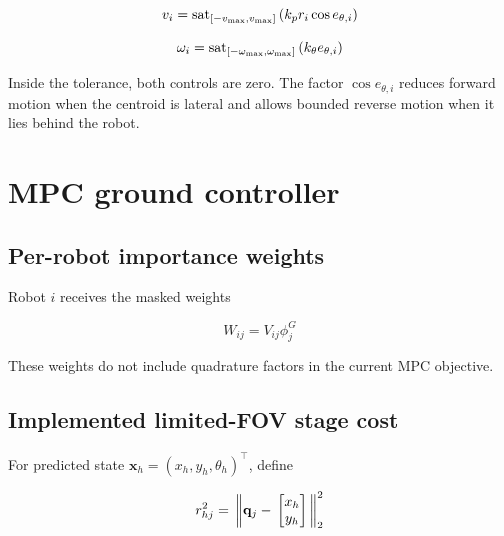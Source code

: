 \documentclass[11pt]{article}
\begin{document}
\begin{equation}
v_i \\
= \\
\mathrm{sat}_{[-v_{\max},v_{\max}]} \\
\left(k_p r_i\cos e_{\theta,i}\right)
\end{equation}


\begin{equation}
\omega_i \\
= \\
\mathrm{sat}_{[-\omega_{\max},\omega_{\max}]} \\
\left(k_\theta e_{\theta,i}\right)
\end{equation}


Inside the tolerance, both controls are zero. The factor $\cos e_{\theta,i}$ reduces forward motion when the centroid is lateral and allows bounded reverse motion when it lies behind the robot.


\section{MPC ground controller}


\subsection{Per-robot importance weights}


Robot $i$ receives the masked weights


\begin{equation}
W_{ij}=V_{ij}\phi^G_j
\end{equation}


These weights do not include quadrature factors in the current MPC objective.


\subsection{Implemented limited-FOV stage cost}


For predicted state $\mathbf x_h=(x_h,y_h,\theta_h)^\top$, define


\begin{equation}
r_{hj}^2 \\
= \\
\left\lVert \\
\mathbf q_j- \\
\begin{bmatrix}x_h\\y_h\end{bmatrix} \\
\right\rVert_2^2
\end{equation}
\end{document}
